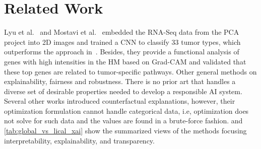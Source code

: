 \section{Related Work}\label{chapter_5:rw}
Lyu et al.~\cite{lyu2018deep} and Mostavi et al.~\cite{mostavi2019convolutional} embedded the RNA-Seq data from the PCA project into 2D images and trained a CNN to classify 33 tumor types, which outperforms the approach in~\cite{li2017comprehensive}. Besides, they provide a functional analysis of genes with high intensities in the HM based on Grad-CAM and validated that these top genes are related to tumor-specific pathways. Other general methods on explainability, fairness and robustness. There is no prior art that handles a diverse set of desirable properties needed to develop a responsible AI system. Several other works introduced counterfactual explanations, however, their optimization formulation cannot handle categorical data, i.e, optimization does not solve for such data and the values are found in a brute-force fashion.  and \cref{tab:global_vs_lical_xai} show the summarized views of the methods focusing interpretability, explainability, and transparency. 


